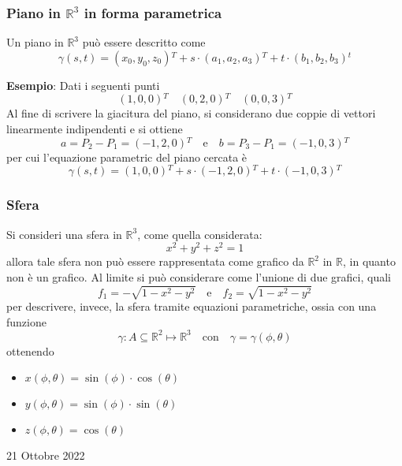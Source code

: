 \documentclass[a4paper]{extarticle}
\begin{document}
\vspace{2em}
\noindent
\subsubsection{Piano in $\mathbb{R}^3$ in forma parametrica}
Un piano in $\mathbb{R}^3$ può essere descritto come
\[\gamma(s,t) = (x_0,y_0,z_0){^T} + s \cdot (a_1,a_2,a_3){^T} + t \cdot (b_1,b_2,b_3){^t}\]

\vspace{1em}
\noindent
\textbf{Esempio}: Dati i seguenti punti
\[(1,0,0){^T} \hspace{1em} (0,2,0){^T} \hspace{1em} (0,0,3){^T}\]
Al fine di scrivere la giacitura del piano, si considerano due coppie di vettori linearmente indipendenti e si ottiene
\[a=P_2-P_1=(-1,2,0){^T} \hspace{1em} \text{e} \hspace{1em} b=P_3-P_1=(-1,0,3){^T}\]
per cui l'equazione parametric del piano cercata è
\[\gamma(s,t)=(1,0,0){^T} + s \cdot (-1,2,0){^T} + t \cdot (-1,0,3){^T}\]

\vspace{1em}
\noindent
\subsubsection{Sfera}
Si consideri una sfera in $\mathbb{R}^3$, come quella considerata:
\[x^2+y^2+z^2=1\]
allora tale sfera non può essere rappresentata come grafico da $\mathbb{R}^2$ in $\mathbb{R}$, in quanto non è un grafico. Al limite si può considerare come l'unione di due grafici, quali
\[f_1=-\sqrt{1-x^2-y^2} \hspace{1em} \text{e} \hspace{1em} f_2=\sqrt{1-x^2-y^2}\]
per descrivere, invece, la sfera tramite equazioni parametriche, ossia con una funzione
\[\gamma : A \subseteq \mathbb{R}^2 \longmapsto \mathbb{R}^3 \hspace{1em} \text{con} \hspace{1em} \gamma=\gamma(\phi,\theta)\]
ottenendo
\begin{itemize}
    \item $x(\phi,\theta)=\sin(\phi) \cdot \cos(\theta)$
    \item $y(\phi,\theta)=\sin(\phi) \cdot \sin(\theta)$
    \item $z(\phi,\theta)=\cos(\theta)$
\end{itemize}

\newpage
\noindent
\begin{center}
    21 Ottobre 2022
\end{center}
\end{document}
